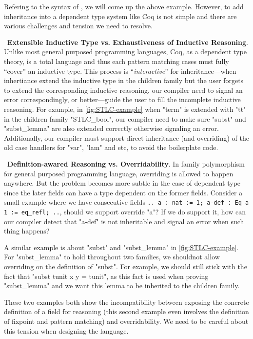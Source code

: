 Refering to the syntax of \citet{zm2017}, we will come up the above
example. However, to add inheritance into a dependent type system like
Coq is not simple and there are various challenges and tension we need
to resolve. 


~\textbf{Extensible Inductive Type vs. Exhaustiveness of Inductive Reasoning}.
Unlike most general purposed programming languages, Coq, as a dependent
type theory, is a total language and thus each pattern matching cases
must fully ``cover'' an inductive type. This process is
``\textit{interactive}'' for inheritance---when inhertiance extend the
inductive type in the children family but the user forgets to extend the
corresponding inductive reasoning, our compiler need to signal an error
correspondingly, or better---guide the user to fill the incomplete
inductive reasoning. For example, in \cref{fig:STLC-example} when "term"
is extended with "tt" in the children family "STLC_bool", our compiler
need to make sure "subst" and "subst_lemma" are also extended correctly
otherwise signaling an error.
Additionally, our compiler must support direct inheritance (and
overriding) of the old case handlers for "var", "lam" and etc, to avoid
the boilerplate code. 


~\textbf{Definition-awared Reasoning vs. Overridability}.
In family polymorphism for general purposed programming language,
overriding is allowed to happen anywhere. But the problem becomes more
subtle in the case of dependent type since the later fields can have a
type dependent on the former fields.  Consider a small example where we
have consecutive fields \texttt{{.. a : nat := 1; a-def : Eq a
1 := eq_refl; ..}}, should we support override "a"? If we do support it,
how can our compiler detect that "a-def" is not inheritable and signal
an error when such thing happens? 

A similar example is about "subst" and "subst_lemma" in
\cref{fig:STLC-example}. For "subst_lemma" to hold throughout two
families, we shouldnot allow overriding on the definition of "subst".
For example, we should still stick with the fact that "subst tunit x y =
tunit", as this fact is used when proving "subst_lemma" and we want this
lemma to be inherited to the children family.

These two examples both show the incompatibility between exposing the
concrete definition of a field for reasoning (this second example even
involves the definition of fixpoint and pattern matching) and
overridability. We need to be careful about this tension when designing
the language.

